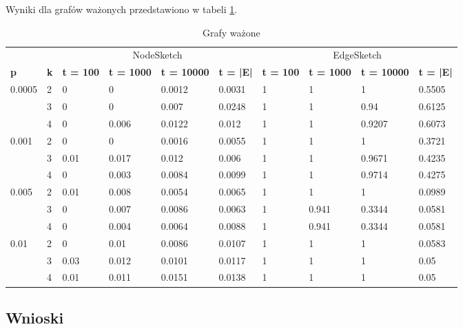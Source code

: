    Wyniki dla grafów ważonych przedstawiono w tabeli \ref{tab:weighted_graphs}.

    \begin{table}[!ht]
        \small
        \centering
        \begin{tabular}{|l|l|l|l|l|l|l|l|l|l|}
        \hline
        & & \multicolumn{4}{c|}{NodeSketch} & \multicolumn{4}{c|}{EdgeSketch} \\ \cline{1-10}
                \textbf{p} & \textbf{k} & \textbf{t = 100} & \textbf{t = 1000} & \textbf{t = 10000} & \textbf{t = |E|} & \textbf{t = 100} & \textbf{t = 1000} & \textbf{t = 10000} & \textbf{t = |E|} \\ \hline\hline
            \multirow{3}{*}{0.0005} & 2 & 0 & 0 & 0.0012 & 0.0031 & 1 & 1 & 1 & 0.5505 \\ \cline{2-10}
            & 3 & 0 & 0 & 0.007 & 0.0248 & 1 & 1 & 0.94 & 0.6125 \\ \cline{2-10}
            & 4 & 0 & 0.006 & 0.0122 & 0.012 & 1 & 1 & 0.9207 & 0.6073 \\ \hline\hline
            \multirow{3}{*}{0.001} & 2 & 0 & 0 & 0.0016 & 0.0055 & 1 & 1 & 1 & 0.3721 \\ \cline{2-10}
            & 3 & 0.01 & 0.017 & 0.012 & 0.006 & 1 & 1 & 0.9671 & 0.4235 \\ \cline{2-10}
            & 4 & 0 & 0.003 & 0.0084 & 0.0099 & 1 & 1 & 0.9714 & 0.4275 \\ \hline\hline
            \multirow{3}{*}{0.005} & 2 & 0.01 & 0.008 & 0.0054 & 0.0065 & 1 & 1 & 1 & 0.0989 \\ \cline{2-10}
            & 3 & 0 & 0.007 & 0.0086 & 0.0063 & 1 & 0.941 & 0.3344 & 0.0581 \\ \cline{2-10}
            & 4 & 0 & 0.004 & 0.0064 & 0.0088 & 1 & 0.941 & 0.3344 & 0.0581 \\ \hline\hline
            \multirow{3}{*}{0.01} & 2 & 0 & 0.01 & 0.0086 & 0.0107 & 1 & 1 & 1 & 0.0583 \\ \cline{2-10}
            & 3 & 0.03 & 0.012 & 0.0101 & 0.0117 & 1 & 1 & 1 & 0.05 \\ \cline{2-10}
            & 4 & 0.01 & 0.011 & 0.0151 & 0.0138 & 1 & 1 & 1 & 0.05 \\ \hline
        \end{tabular}
        \label{tab:weighted_graphs}
        \caption{Grafy ważone}
    \end{table}

    \subsection{Wnioski}


